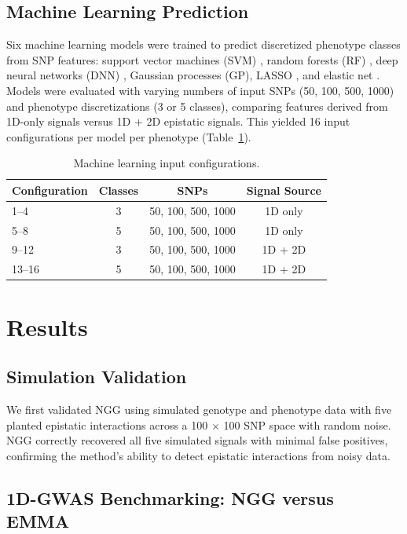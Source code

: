 \documentclass[11pt]{article}
\begin{document}
\subsection{Machine Learning Prediction}

Six machine learning models were trained to predict discretized phenotype classes from SNP features: support vector machines (SVM) \citep{cortes1995}, random forests (RF) \citep{breiman2001}, deep neural networks (DNN) \citep{lecun2015}, Gaussian processes (GP), LASSO \citep{tibshirani1996}, and elastic net \citep{zou2005}. Models were evaluated with varying numbers of input SNPs (50, 100, 500, 1000) and phenotype discretizations (3 or 5 classes), comparing features derived from 1D-only signals versus 1D + 2D epistatic signals. This yielded 16 input configurations per model per phenotype (Table~\ref{tab:mlconfigs}).

\begin{table}[htbp]
\centering
\caption{Machine learning input configurations.}
\label{tab:mlconfigs}
\begin{tabular}{lccc}
\toprule
Configuration & Classes & SNPs & Signal Source \\
\midrule
1--4 & 3 & 50, 100, 500, 1000 & 1D only \\
5--8 & 5 & 50, 100, 500, 1000 & 1D only \\
9--12 & 3 & 50, 100, 500, 1000 & 1D + 2D \\
13--16 & 5 & 50, 100, 500, 1000 & 1D + 2D \\
\bottomrule
\end{tabular}
\end{table}

\section{Results}

\subsection{Simulation Validation}

We first validated NGG using simulated genotype and phenotype data with five planted epistatic interactions across a 100 $\times$ 100 SNP space with random noise. NGG correctly recovered all five simulated signals with minimal false positives, confirming the method's ability to detect epistatic interactions from noisy data.

\subsection{1D-GWAS Benchmarking: NGG versus EMMA}
\end{document}

